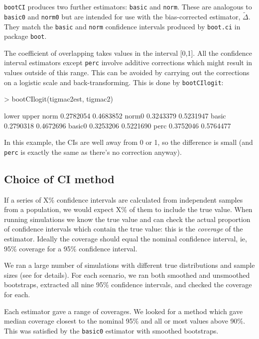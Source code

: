 \documentclass[a4paper]{article}
\begin{document}
\texttt{bootCI} produces two further estimators: \texttt{basic} and \texttt{norm}. These are analogous to \texttt{basic0} and \texttt{norm0} but are intended for use with the bias-corrected estimator, $\tilde{\Delta}$. They match the \texttt{basic} and \texttt{norm} confidence intervals produced by \texttt{boot.ci} in package \texttt{boot}.

The coefficient of overlapping takes values in the interval [0,1]. All the confidence interval estimators except \texttt{perc} involve additive corrections which might result in values outside of this range. This can be avoided by carrying out the corrections on a logistic scale and back-transforming. This is done by \texttt{bootCIlogit}:

\begin{Schunk}
\begin{Sinput}
> bootCIlogit(tigmac2est, tigmac2)
\end{Sinput}
\begin{Soutput}
           lower     upper
norm   0.2782054 0.4683852
norm0  0.3243379 0.5231947
basic  0.2790318 0.4672696
basic0 0.3253206 0.5221690
perc   0.3752046 0.5764477
\end{Soutput}
\end{Schunk}

In this example, the CIs are well away from 0 or 1, so the difference is small (and \texttt{perc} is exactly the same as there's no correction anyway).

\subsection{Choice of CI method}
\label{subsec:whichCI}

If a series of X\% confidence intervals are calculated from independent samples from a population, we would expect X\% of them to include the true value. When running simulations we know the true value and can check the actual proportion of confidence intervals which contain the true value: this is the \emph{coverage} of the estimator. Ideally the coverage should equal the nominal confidence interval, ie, 95\% coverage for a 95\% confidence interval.

We ran a large number of simulations with different true distributions and sample sizes (see \citet{RidoutLinkie2009} for details). For each scenario, we ran both smoothed and unsmoothed bootstraps, extracted all nine 95\% confidence intervals, and checked the coverage for each.

Each estimator gave a range of coverages. We looked for a method which gave median coverage closest to the nominal 95\% and all or most values above 90\%. This was satisfied by the \texttt{basic0} estimator with smoothed bootstraps.
\end{document}
